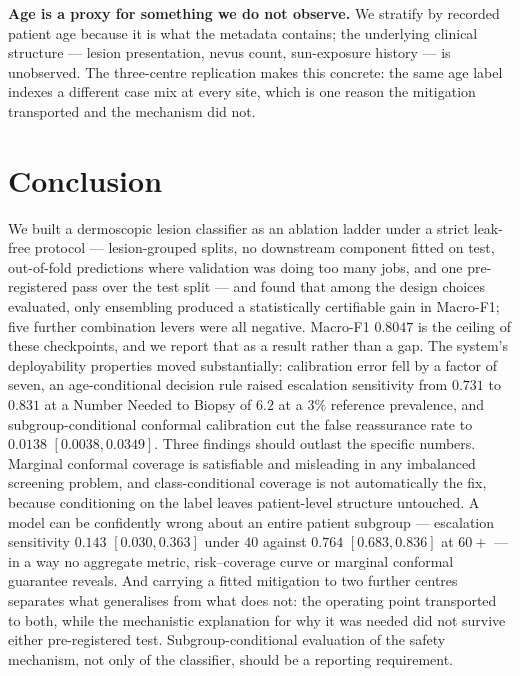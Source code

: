 \documentclass[journal]{IEEEtran}
\begin{document}
\textbf{Age is a proxy for something we do not observe.} We stratify by recorded patient age
because it is what the metadata contains; the underlying clinical structure --- lesion
presentation, nevus count, sun-exposure history --- is unobserved. The three-centre replication
makes this concrete: the same age label indexes a different case mix at every site, which is
one reason the mitigation transported and the mechanism did not.

\section{Conclusion}

We built a dermoscopic lesion classifier as an ablation ladder under a strict leak-free
protocol --- lesion-grouped splits, no downstream component fitted on test, out-of-fold
predictions where validation was doing too many jobs, and one pre-registered pass over the test
split --- and found that among the design choices evaluated, only ensembling produced a
statistically certifiable gain in Macro-F1; five further combination levers were all negative.
Macro-F1 $0.8047$ is the ceiling of these checkpoints, and we report that as a result rather
than a gap. The system's deployability properties moved substantially: calibration error fell
by a factor of seven, an age-conditional decision rule raised escalation sensitivity from
$0.731$ to $0.831$ at a Number Needed to Biopsy of $6.2$ at a $3\%$ reference prevalence, and
subgroup-conditional conformal calibration cut the false reassurance rate to $0.0138$
$[0.0038,0.0349]$. Three findings should outlast the specific numbers. Marginal conformal
coverage is satisfiable and misleading in any imbalanced screening problem, and class-conditional
coverage is not automatically the fix, because conditioning on the label leaves patient-level
structure untouched. A model can be confidently wrong about an entire patient subgroup ---
escalation sensitivity $0.143$ $[0.030,0.363]$ under $40$ against $0.764$ $[0.683,0.836]$ at
$60+$ --- in a way no aggregate metric, risk--coverage curve or marginal conformal guarantee
reveals. And carrying a fitted mitigation to two further centres separates what generalises from
what does not: the operating point transported to both, while the mechanistic explanation for
why it was needed did not survive either pre-registered test. Subgroup-conditional evaluation of
the safety mechanism, not only of the classifier, should be a reporting requirement.
\end{document}
